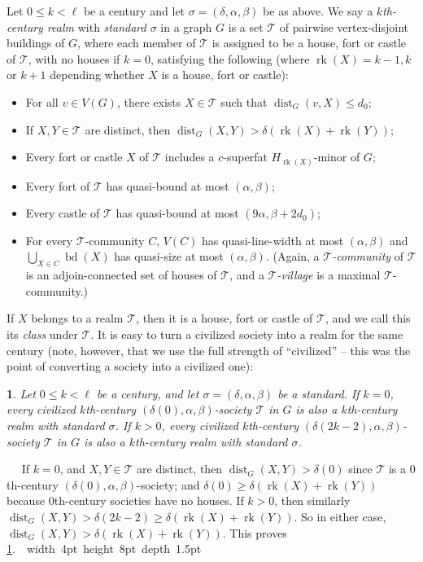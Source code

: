 \documentclass[titlepage,11pt]{article}
\newcommand\blackslug{\hbox{\hskip 1pt \vrule width 4pt height 8pt depth 1.5pt
		\hskip 1pt}}
\newcommand\bbox{\hfill \quad \blackslug \bigbreak}
\newcommand{\dist}{\operatorname{dist}}
\newcommand{\rk}{\operatorname{rk}}
\newcommand{\bd}{\operatorname{bd}}
\newcommand{\mac}{\mathcal}
\newtheorem{thm}{}[section]
\newcommand{\Proof}{\noindent{\bf Proof.}\ \ }
\begin{document}
	Let $0\le k<\ell$ be a century and let $\sigma=(\delta, \alpha,\beta)$ be as above. We say a {\em $k$th-century realm} with {\em standard $\sigma$} in a graph $G$ is a set $\mac T$ of pairwise vertex-disjoint buildings of $G$, 
	where each member of $\mac T$ is assigned to be a house, fort or castle of $\mac T$, with no houses if $k=0$, 
	satisfying the following (where $\rk(X)=k-1,k$ or $k+1$ depending whether $X$ is a house, fort or castle):
	\begin{itemize}
		\item For all $v\in V(G)$, there exists $X\in \mathcal{T}$ such that $\dist_G(v,X)\le d_0$;
		\item If $X,Y\in \mac T$ are distinct, then $\dist_G(X,Y)>\delta(\rk(X)+\rk(Y))$; 
		\item Every fort or castle $X$ of $\mac T$ includes a $c$-superfat $H_{\rk(X)}$-minor of $G$;
		\item Every fort of $\mac T$ has quasi-bound at most $(\alpha, \beta)$; 
		\item Every castle of $\mac T$ has quasi-bound at most $(9\alpha, \beta+2d_0)$;
		\item For every $\mac T$-community $C$, $V(C)$ has quasi-line-width at most $(\alpha,\beta)$ and 
		$\bigcup_{X\in C}\bd (X)$ has quasi-size at most $(\alpha,\beta)$.
		(Again, a {\em $\mac T$-community} of $\mac T$ is an adjoin-connected set of houses of $\mac T$, and a {\em $\mac T$-village} is a maximal $\mac T$-community.)
	\end{itemize}
	If $X$ belongs to a realm $\mac T$, then it is a house, fort or castle of $\mac T$, and we call this its {\em class} under $\mac T$.
	It is easy to turn a civilized society into a realm for the same century (note, however, that we use the full strength of 
	``civilized'' -- this was the point of converting a society into a civilized one):
	\begin{thm}\label{bestsoctorealm}
		Let $0\le k<\ell$ be a century, and let $\sigma=(\delta,\alpha,\beta)$ be a standard. 
		If $k=0$, every civilized $k$th-century $(\delta(0),\alpha,\beta)$-society $\mac T$ in $G$ is also a $k$th-century realm with standard $\sigma$.
		If $k>0$, every civilized $k$th-century $(\delta(2k-2),\alpha,\beta)$-society $\mac T$ in $G$ is also a $k$th-century realm with standard $\sigma$.
	\end{thm}
	\Proof
	If $k=0$, and  $X,Y\in \mac T$ are distinct, then $\dist_G(X,Y)>\delta(0)$ since $\mac T$ is a $0$th-century 
	$(\delta(0),\alpha,\beta)$-society; and $\delta(0) \ge \delta(\rk(X)+\rk(Y))$ because $0$th-century societies
	have no houses.  If $k>0$, then similarly $\dist_G(X,Y)>\delta(2k-2)\ge \delta(\rk(X)+\rk(Y))$. So in either case, 
	$\dist_G(X,Y)> \delta(\rk(X)+\rk(Y))$.
	This proves \ref{bestsoctorealm}.~\bbox
	
\end{document}
